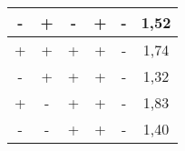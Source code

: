 \begin{table}[H]
\begin{tabular}{|c|c|c|c|c|c|}
        \rowcolor[HTML]{EFEFEF} 
        -              & +               & -                & +                 & -                  & 1,52           \\ \hline
        +              & +               & +                & +                 & -                  & 1,74           \\ \hline
        \rowcolor[HTML]{EFEFEF} 
        -              & +               & +                & +                 & -                  & 1,32           \\ \hline
        +              & -               & +                & +                 & -                  & 1,83           \\ \hline
        \rowcolor[HTML]{EFEFEF} 
        -              & -               & +                & +                 & -                  & 1,40           \\ \hline
        \end{tabular}
        \label{tab:dados_experimento}
    \end{table}
